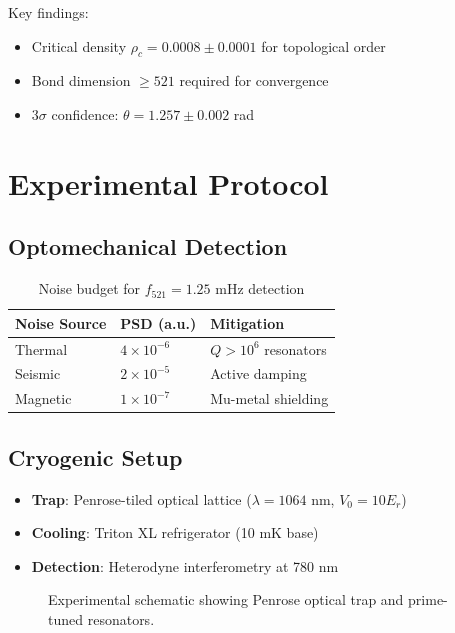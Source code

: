 \documentclass{article}
\theoremstyle{plain}
\begin{document}
Key findings:
\begin{itemize}
\item Critical density $\rho_c = 0.0008 \pm 0.0001$ for topological order
\item Bond dimension $\geq 521$ required for convergence
\item $3\sigma$ confidence: $\theta = 1.257 \pm 0.002$ rad
\end{itemize}

\section{Experimental Protocol}

\subsection{Optomechanical Detection}
\begin{table}[h]
\centering
\caption{Noise budget for $f_{521} = 1.25$ mHz detection}
\begin{tabular}{@{}lll@{}}
\toprule
Noise Source & PSD (a.u.) & Mitigation \\
\midrule
Thermal & $4 \times 10^{-6}$ & $Q > 10^6$ resonators \\
Seismic & $2 \times 10^{-5}$ & Active damping \\
Magnetic & $1 \times 10^{-7}$ & Mu-metal shielding \\
\bottomrule
\end{tabular}
\end{table}

\subsection{Cryogenic Setup}
\begin{itemize}
\item \textbf{Trap}: Penrose-tiled optical lattice ($\lambda = 1064$ nm, $V_0 = 10E_r$)
\item \textbf{Cooling}: Triton XL refrigerator (10 mK base)
\item \textbf{Detection}: Heterodyne interferometry at 780 nm
\end{itemize}

\begin{figure}[h]
\centering
{}
\caption{Experimental schematic showing Penrose optical trap and prime-tuned resonators.}
\end{figure}
\end{document}
